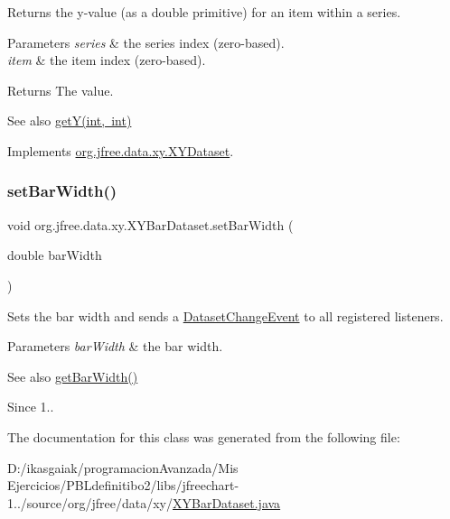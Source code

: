 Returns the y-\/value (as a double primitive) for an item within a series.


\begin{DoxyParams}{Parameters}
{\em series} & the series index (zero-\/based). \\
\hline
{\em item} & the item index (zero-\/based).\\
\hline
\end{DoxyParams}
\begin{DoxyReturn}{Returns}
The value.
\end{DoxyReturn}
\begin{DoxySeeAlso}{See also}
\mbox{\hyperlink{classorg_1_1jfree_1_1data_1_1xy_1_1_x_y_bar_dataset_a737db1e347fb9cb8b75179a54cf38287}{get\+Y(int, int)}} 
\end{DoxySeeAlso}


Implements \mbox{\hyperlink{interfaceorg_1_1jfree_1_1data_1_1xy_1_1_x_y_dataset_a5e86389417eb5ed7b663a952ca370914}{org.\+jfree.\+data.\+xy.\+X\+Y\+Dataset}}.

\mbox{\label{classorg_1_1jfree_1_1data_1_1xy_1_1_x_y_bar_dataset_a866a70de4ee5b64b0a5da23ae4a140fa}} 
\subsubsection{\texorpdfstring{set\+Bar\+Width()}{setBarWidth()}}
{\footnotesize\ttfamily void org.\+jfree.\+data.\+xy.\+X\+Y\+Bar\+Dataset.\+set\+Bar\+Width (\begin{DoxyParamCaption}\item[{double}]{bar\+Width }\end{DoxyParamCaption})}

Sets the bar width and sends a \mbox{\hyperlink{}{Dataset\+Change\+Event}} to all registered listeners.


\begin{DoxyParams}{Parameters}
{\em bar\+Width} & the bar width.\\
\hline
\end{DoxyParams}
\begin{DoxySeeAlso}{See also}
\mbox{\hyperlink{classorg_1_1jfree_1_1data_1_1xy_1_1_x_y_bar_dataset_a6bc368e299939e55a2787aa3e48c618b}{get\+Bar\+Width()}} 
\end{DoxySeeAlso}
\begin{DoxySince}{Since}
1.. 
\end{DoxySince}


The documentation for this class was generated from the following file\+:\begin{DoxyCompactItemize}
\item 
D\+:/ikasgaiak/programacion\+Avanzada/\+Mis Ejercicios/\+P\+B\+Ldefinitibo2/libs/jfreechart-\/1../source/org/jfree/data/xy/\mbox{\hyperlink{_x_y_bar_dataset_8java}{X\+Y\+Bar\+Dataset.\+java}}\end{DoxyCompactItemize}
